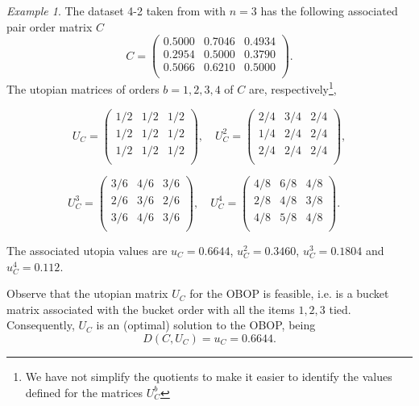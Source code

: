 \documentclass[preprint,12pt]{article}
\theoremstyle{definition}
\theoremstyle{remark}
\theoremstyle{example} %
\newtheorem{example}{Example}[section]
\begin{document}
\begin{example} The dataset 4-2 taken from \cite{Mattei2013} with $n=3$ has the following associated pair order matrix $C$ 
\[
C=\left(
  \begin{array}{ccc}
0.5000     & 0.7046  &  0.4934 \\
0.2954     & 0.5000  &  0.3790  \\
0.5066     & 0.6210  &  0.5000     \\
  \end{array}
\right).
\]
The utopian matrices of orders $b=1,2,3,4$ of $C$ are, respectively\footnote{We have not simplify the quotients to make it easier to identify the values defined for the matrices $U_C^b$},

\[
U_C = \left(
  \begin{array}{ccc}
1/2 & 1/2   &  1/2 \\
1/2 & 1/2   &  1/2  \\
1/2 & 1/2   &  1/2   \\
  \end{array}
\right),
\quad 
U_C^2 = \left(
  \begin{array}{ccc}
2/4     & 3/4  &  2/4 \\
1/4     & 2/4  &  2/4 \\
2/4     & 2/4  &  2/4 \\
  \end{array}
\right),
\]

\[
U_C^3 = \left(
  \begin{array}{ccc}
3/6  & 4/6    &  3/6 \\
2/6  & 3/6    &  2/6  \\
3/6  & 4/6    &  3/6   \\
  \end{array}
\right), 
\quad
U_C^4 = \left(
  \begin{array}{cccc}
4/8     & 6/8   &  4/8 \\
2/8     & 4/8   &  3/8 \\
4/8     & 5/8  &  4/8 \\
  \end{array}
\right).
\quad 
\]


The associated utopia values are  $u_C=0.6644$,  $u_C^2=0.3460$, $u_C^3=0.1804$ and $u_C^4=0.112$. 

Observe that the utopian matrix $U_C$ for the {\rm OBOP} is feasible, i.e. is a bucket matrix associated with the bucket order with all the items $1,2,3$ tied. Consequently, $U_C$ is an (optimal) solution to the {\rm OBOP}, being 
\[
D(C,U_C)=u_C=0.6644.
\]


\end{example}
\end{document}
